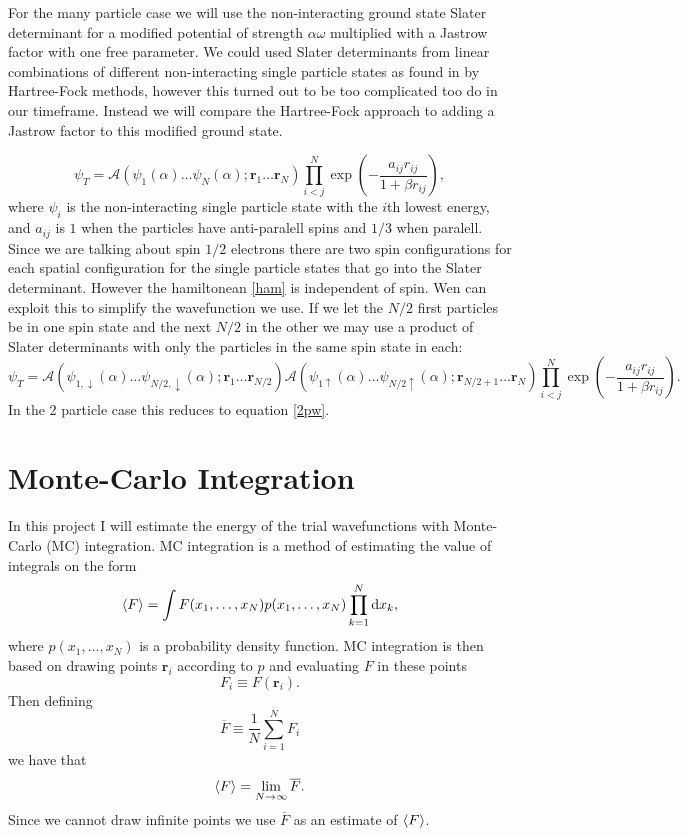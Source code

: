 \documentclass[a4paper,English,10pt]{article}
\newcommand{\bb}[1]{\boldsymbol{#1}}
\newcommand{\dd}{\mathrm{d}}
\newcommand{\rar}{\rightarrow}
\newcommand{\uar}{\uparrow}
\newcommand{\dar}{\downarrow}
\newcommand{\be}{\begin{equation}}
\newcommand{\ee}{\end{equation}}
\newcommand{\f}{\frac}
\renewcommand{\bar}{\overline}
\renewcommand{\braket}{\Braket}
\begin{document}
For the many particle case we will use the non-interacting ground state Slater determinant for a modified potential of strength $\alpha\omega$
multiplied with a Jastrow factor with one free parameter.
We could used Slater determinants from linear combinations of different non-interacting single particle states as found in \cite{proj1} by Hartree-Fock methods,
however this turned out to be too complicated too do in our timeframe. Instead we will compare the Hartree-Fock approach to adding a Jastrow factor to this modified ground state.

\be
\psi_T =  \mathcal{A}\left(\psi_1(\alpha)\ldots\psi_N(\alpha);\bb{r}_1\ldots\bb{r}_N\right)\prod_{i<j}^N\exp\left(-\f{a_{ij}r_{ij}}{1+\beta r_{ij}}\right),
\ee
where  $\psi_i$ is the non-interacting single particle state with the $i$th lowest energy,
and $a_{ij}$ is $1$ when the particles have anti-paralell spins and $1/3$ when paralell.
Since we are talking about spin $1/2$ electrons there are two spin configurations for each spatial configuration for the single particle states that go into the Slater determinant.
However the hamiltonean \ref{ham} is independent of spin. Wen can exploit this to simplify the wavefunction we use. If we let
the $N/2$ first particles be in one spin state and the next $N/2$ in the other we may use a product of Slater determinants with only the particles in the same spin state in each:
\be
\psi_T = \mathcal{A}\left(\psi_{1,\dar}(\alpha)\ldots\psi_{N/2,\dar}(\alpha);\bb{r}_1\ldots\bb{r}_{N/2}\right)\mathcal{A}\left(\psi_{1\uar}(\alpha)\ldots\psi_{N/2\uar}(\alpha);\bb{r}_{N/2+1}\ldots\bb{r}_N\right)\prod_{i<j}^N\exp\left(-\f{a_{ij}r_{ij}}{1+\beta r_{ij}}\right).\label{npw}
\ee
In the 2 particle case this reduces to equation \ref{2pw}.


\section{Monte-Carlo Integration}

In this project I will estimate the energy of the trial wavefunctions with Monte-Carlo (MC) integration.
MC integration is a method of estimating the value of integrals on the form
\be
\braket{F} = \int F(x_1,\ldots,x_N)p(x_1,\ldots,x_N)\prod_{k=1}^N\dd x_k, \label{MCI}
\ee
where \(p(x_1,\ldots,x_N)\) is a probability density function.
MC integration is then based on drawing points $\bb{r}_i$ according to $p$ and evaluating $F$ in these points
\be
F_i \equiv F(\bb{r}_i).
\ee
Then defining
\be
\bar{F} \equiv \f{1}{N}\sum_{i=1}^N F_i
\ee
we have that
\be
\braket{F} = \lim_{N\rar\infty}\bar{F}.
\ee
Since we cannot draw infinite points we use $\bar{F}$ as an estimate of $\braket{F}$.
\end{document}
